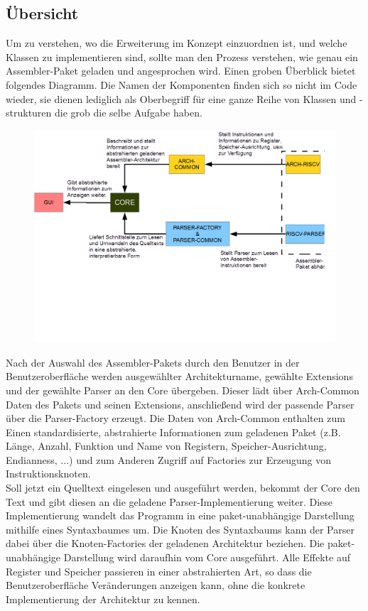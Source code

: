 \subsection{Übersicht}
Um zu verstehen, wo die Erweiterung im Konzept einzuordnen ist, und welche Klassen zu implementieren sind, sollte man den Prozess verstehen, wie genau ein Assembler-Paket geladen und angesprochen wird. Einen groben Überblick bietet folgendes Diagramm. Die Namen der Komponenten finden sich so nicht im Code wieder, sie dienen lediglich als Oberbegriff für eine ganze Reihe von Klassen und -strukturen die grob die selbe Aufgabe haben.
\begin{figure}
	\centering
	\includegraphics[scale=0.5]{charts/extension-overview.png}
	\label{dev-manual-extension-overview}
\end{figure}
Nach der Auswahl des Assembler-Pakets durch den Benutzer in der Benutzeroberfläche werden ausgewählter Architekturname, gewählte Extensions und der gewählte Parser an den Core übergeben. Dieser lädt über Arch-Common Daten des Pakets und seinen Extensions, anschließend wird der passende Parser über die Parser-Factory erzeugt. Die Daten von Arch-Common enthalten zum Einen standardisierte, abstrahierte Informationen zum geladenen Paket (z.B. Länge, Anzahl, Funktion und Name von Registern, Speicher-Ausrichtung, Endianness, ...) und zum Anderen Zugriff auf Factories zur Erzeugung von Instruktionsknoten.\\
Soll jetzt ein Quelltext eingelesen und ausgeführt werden, bekommt der Core den Text und gibt diesen an die geladene Parser-Implementierung weiter. Diese Implementierung wandelt das Programm in eine paket-unabhängige Darstellung mithilfe eines Syntaxbaumes um. Die Knoten des Syntaxbaums kann der Parser dabei über die Knoten-Factories der geladenen Architektur beziehen. Die paket-unabhängige Darstellung wird daraufhin vom Core ausgeführt. Alle Effekte auf Register und Speicher passieren in einer abstrahierten Art, so dass die Benutzeroberfläche Veränderungen anzeigen kann, ohne die konkrete Implementierung der Architektur zu kennen.\\

